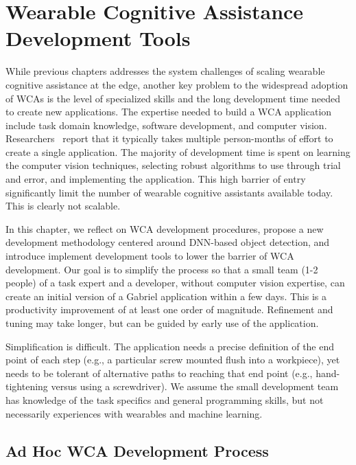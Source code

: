 \chapter{Wearable Cognitive Assistance Development Tools}
\label{chapter: app-dev}

While previous chapters addresses the system challenges of scaling wearable
cognitive assistance at the edge, another key problem to the widespread adoption
of WCAs is the level of specialized skills and the long development time needed
to create new applications. The expertise needed to build a WCA application
include task domain knowledge, software development, and computer vision.
Researchers~\cite{chen2018application} report that it typically takes multiple
person-months of effort to create a single application. The majority of
development time is spent on learning the computer vision techniques, selecting
robust algorithms to use through trial and error, and implementing the
application. This high barrier of entry significantly limit the number of
wearable cognitive assistants available today. This is clearly not scalable. 

In this chapter, we reflect on WCA development procedures, propose a new
development methodology centered around DNN-based object detection, and
introduce implement development tools to lower the barrier of WCA development.
Our goal is to simplify the process so that a small team (1-2 people) of a task
expert and a developer, without computer vision expertise, can create an initial
version of a Gabriel application within a few days. This is a productivity
improvement of at least one order of magnitude. Refinement and tuning may take
longer, but can be guided by early use of the application. 

Simplification is difficult. The application needs a precise definition of the
end point of each step (e.g., a particular screw mounted flush into a
workpiece), yet needs to be tolerant of alternative paths to reaching that end
point (e.g., hand-tightening versus using a screwdriver). We assume the small
development team has knowledge of the task specifics and general programming
skills, but not necessarily experiences with wearables and machine learning.

\section{Ad Hoc WCA Development Process}
\label{sec: app-dev-adhoc}

